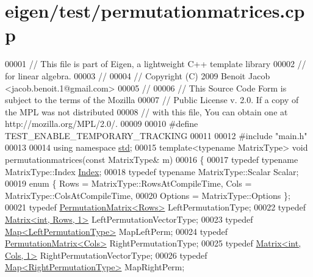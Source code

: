 \hypertarget{eigen_2test_2permutationmatrices_8cpp_source}{}\section{eigen/test/permutationmatrices.cpp}
\label{eigen_2test_2permutationmatrices_8cpp_source}

\begin{DoxyCode}
00001 \textcolor{comment}{// This file is part of Eigen, a lightweight C++ template library}
00002 \textcolor{comment}{// for linear algebra.}
00003 \textcolor{comment}{//}
00004 \textcolor{comment}{// Copyright (C) 2009 Benoit Jacob <jacob.benoit.1@gmail.com>}
00005 \textcolor{comment}{//}
00006 \textcolor{comment}{// This Source Code Form is subject to the terms of the Mozilla}
00007 \textcolor{comment}{// Public License v. 2.0. If a copy of the MPL was not distributed}
00008 \textcolor{comment}{// with this file, You can obtain one at http://mozilla.org/MPL/2.0/.}
00009 
00010 \textcolor{preprocessor}{#define TEST\_ENABLE\_TEMPORARY\_TRACKING}
00011   
00012 \textcolor{preprocessor}{#include "main.h"}
00013 
00014 \textcolor{keyword}{using namespace }\hyperlink{namespacestd}{std};
00015 \textcolor{keyword}{template}<\textcolor{keyword}{typename} MatrixType> \textcolor{keywordtype}{void} permutationmatrices(\textcolor{keyword}{const} MatrixType& m)
00016 \{
00017   \textcolor{keyword}{typedef} \textcolor{keyword}{typename} MatrixType::Index \hyperlink{namespace_eigen_a62e77e0933482dafde8fe197d9a2cfde}{Index};
00018   \textcolor{keyword}{typedef} \textcolor{keyword}{typename} MatrixType::Scalar Scalar;
00019   \textcolor{keyword}{enum} \{ Rows = MatrixType::RowsAtCompileTime, Cols = MatrixType::ColsAtCompileTime,
00020          Options = MatrixType::Options \};
00021   \textcolor{keyword}{typedef} \hyperlink{group___core___module_class_eigen_1_1_permutation_matrix}{PermutationMatrix<Rows>} LeftPermutationType;
00022   \textcolor{keyword}{typedef} \hyperlink{group___core___module_class_eigen_1_1_matrix}{Matrix<int, Rows, 1>} LeftPermutationVectorType;
00023   \textcolor{keyword}{typedef} \hyperlink{group___core___module_class_eigen_1_1_map}{Map<LeftPermutationType>} MapLeftPerm;
00024   \textcolor{keyword}{typedef} \hyperlink{group___core___module_class_eigen_1_1_permutation_matrix}{PermutationMatrix<Cols>} RightPermutationType;
00025   \textcolor{keyword}{typedef} \hyperlink{group___core___module_class_eigen_1_1_matrix}{Matrix<int, Cols, 1>} RightPermutationVectorType;
00026   \textcolor{keyword}{typedef} \hyperlink{group___core___module_class_eigen_1_1_map}{Map<RightPermutationType>} MapRightPerm;

\end{DoxyCode}
